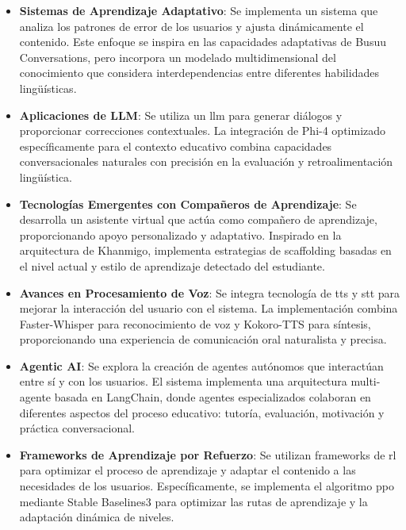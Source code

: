 \begin{itemize}
  \item \textbf{Sistemas de Aprendizaje Adaptativo}: Se implementa un sistema que analiza los patrones de error de los usuarios y ajusta dinámicamente el contenido. Este enfoque se inspira en las capacidades adaptativas de Busuu Conversations, pero incorpora un modelado multidimensional del conocimiento que considera interdependencias entre diferentes habilidades lingüísticas.
  
  \item \textbf{Aplicaciones de LLM}: Se utiliza un \gls{llm} para generar diálogos y proporcionar correcciones contextuales. La integración de Phi-4 optimizado específicamente para el contexto educativo combina capacidades conversacionales naturales con precisión en la evaluación y retroalimentación lingüística.
  
  \item \textbf{Tecnologías Emergentes con Compañeros de Aprendizaje}: Se desarrolla un asistente virtual que actúa como compañero de aprendizaje, proporcionando apoyo personalizado y adaptativo. Inspirado en la arquitectura de Khanmigo, implementa estrategias de scaffolding basadas en el nivel actual y estilo de aprendizaje detectado del estudiante.
  
  \item \textbf{Avances en Procesamiento de Voz}: Se integra tecnología de \gls{tts} y \gls{stt} para mejorar la interacción del usuario con el sistema. La implementación combina Faster-Whisper para reconocimiento de voz y Kokoro-TTS para síntesis, proporcionando una experiencia de comunicación oral naturalista y precisa.
  
  \item \textbf{Agentic AI}: Se explora la creación de agentes autónomos que interactúan entre sí y con los usuarios. El sistema implementa una arquitectura multi-agente basada en LangChain, donde agentes especializados colaboran en diferentes aspectos del proceso educativo: tutoría, evaluación, motivación y práctica conversacional.
  
  \item \textbf{Frameworks de Aprendizaje por Refuerzo}: Se utilizan frameworks de \gls{rl} para optimizar el proceso de aprendizaje y adaptar el contenido a las necesidades de los usuarios. Específicamente, se implementa el algoritmo \gls{ppo} mediante Stable Baselines3 para optimizar las rutas de aprendizaje y la adaptación dinámica de niveles.
\end{itemize}

